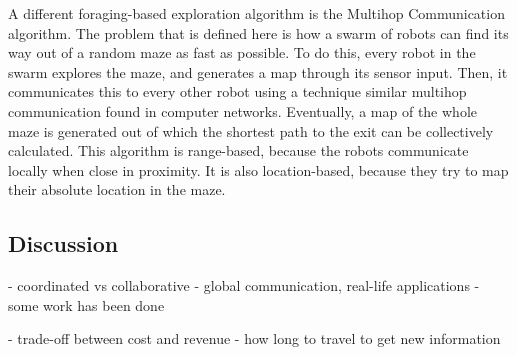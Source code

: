 	A different foraging-based exploration algorithm is the Multihop Communication algorithm. \cite{jung2010multi}
	The problem that is defined here is how a swarm of robots can find its way out of a random maze as fast as possible.
	To do this, every robot in the swarm explores the maze, and generates a map through its sensor input.
	Then, it communicates this to every other robot using a technique similar multihop communication found in computer networks.
	Eventually, a map of the whole maze is generated out of which the shortest path to the exit can be collectively calculated.
	This algorithm is range-based, because the robots communicate locally when close in proximity.
	It is also location-based, because they try to map their absolute location in the maze. 


	
\subsection{Discussion}


	- coordinated vs collaborative
	- global communication, real-life applications
	- some work has been done

	- trade-off between cost and revenue
	- how long to travel to get new information


\begin{table}[H]
	\renewcommand{\arraystretch}{1.3}
	\label{table_alg_exploration}
	\centering
	\caption{Overview of Common Exploration Algorithms}
\end{table}

